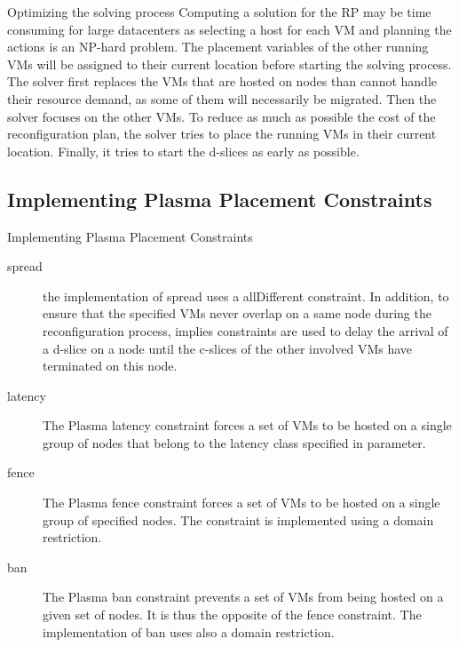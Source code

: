 \begin{frame}{Optimizing the solving process}
Computing a solution for the RP may
be time consuming for large datacenters as selecting a host for each VM and
planning the actions is an \alert{NP-hard} problem.
\br \pause{}
The placement variables of the other
running VMs will be assigned to their current location before starting the solving
process. 
\br \pause{}
The solver first replaces the VMs that are
hosted on nodes than cannot handle their resource demand, as some of them
will necessarily be migrated. Then the solver focuses on the other VMs. To
reduce as much as possible the cost of the reconfiguration plan, the solver tries
to place the running VMs in their current location. Finally, it tries to start the
d-slices as early as possible.
\end{frame}

\subsection{Implementing Plasma Placement Constraints} 
\begin{frame}{Implementing Plasma Placement Constraints}
\begin{description}
\item[spread] the implementation of spread uses a \alert{allDifferent} constraint.
In addition, to ensure that the specified VMs never overlap on
a same node during the reconfiguration process, implies constraints are used to
delay the arrival of a d-slice on a node until the c-slices of the other involved
VMs have terminated on this node. 
 \pause{}
\item[latency] The Plasma latency constraint forces a set of VMs to be hosted on a
single group of nodes that belong to the latency class specified in parameter.
 \pause{}
\item[fence] The Plasma fence constraint forces a set of VMs to be hosted on a
single group of specified nodes. The constraint is implemented using a domain
restriction. 
 \pause{}
\item[ban] The Plasma ban constraint prevents a set of VMs from being hosted
on a given set of nodes. It is thus the opposite of the fence constraint. The
implementation of ban uses also a domain restriction. 
\end{description}
\end{frame}

